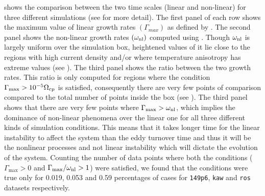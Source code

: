          shows the comparison between the two time scales (linear and
        non-linear) for three different simulations (see  for more detail). The
        first panel of each row shows the maximum value of linear growth rates
        $\left(\Gamma_{max}\right)$ as defined by . The second panel shows
        the non-linear growth rates $\left(\omega_{\rm nl}\right)$ computed using
        . Though $\omega_{\rm nl}$ is largely uniform over the simulation box,
        heightened values of it lie close to the regions with high current density and/or where
        temperature anisotropy has extreme values (see ). The third
        panel shows the ratio between the two growth rates. This ratio is only computed for regions
        where the condition $\Gamma_{\max} > 10^{-5}\Omega_{\rm cp}$ is satisfied, consequently
        there are very few points of comparison compared to the total number of points inside the
        box (see ). The third panel shows that there are very few points where
        $\Gamma_{\max} > \omega_{\rm nl}$, which implies the dominance of non-linear phenomena over
        the linear one for all three different kinds of simulation conditions. This means that it
        takes longer time for the linear instability to affect the system than the eddy turnover
        time and thus it will be the nonlinear processes and not linear instability which will
        dictate the evolution of the system. Counting the number of data points where both the
        conditions ($\Gamma_{\max} > 0$ and $\Gamma_{\max}/\omega_{\rm nl} > 1$) were satisfied, we
        found that the conditions were true only for 0.019, 0.053 and 0.59 percentages of cases for
        \texttt{149p6}, \texttt{kaw} and \texttt{ros} datasets respectively.
        
